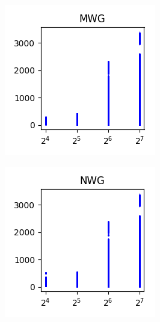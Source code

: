 \documentclass[sigconf,authorversion]{acmart}
\begin{document}
\begin{figure}[hbtp]
    \centering
    \begin{subfigure}[b]{0.3\textwidth}
        \includegraphics[width=\textwidth]{img/MWG.png}
        \label{fig:mwg}
    \end{subfigure}
%
    \begin{subfigure}[b]{0.3\textwidth}
        \includegraphics[width=\textwidth]{img/NWG.png}

\end{subfigure}
\end{figure}
\end{document}
